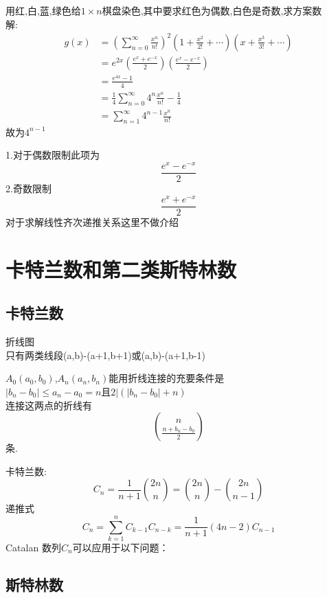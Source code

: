 \begin{example}
  用红,白,蓝,绿色给$1\times n$棋盘染色,其中要求红色为偶数,白色是奇数,求方案数\\
  解:\\
  $$
  \begin{aligned}
    g(x)&=\left(\sum_{n=0}^{\infty}\frac{x^n}{n!} \right)^2\left(1+\frac{x^2}{2!}+\cdots \right)\left(x+\frac{x^3}{3!}+\cdots \right)\\
    &=e^{2x}\left(\frac{e^x+e^{-x}}{2} \right) \left( \frac{e^x-e^{-x}}{2} \right)\\
    &=\frac{e^{4x}-1}{4}\\
    &=\frac{1}{4}\sum_{n=0}^{\infty} 4^{n} \frac{x^n}{n!}-\frac{1}{4}\\
    &=\sum_{n=1}^{\infty} 4^{n-1} \frac{x^n}{n!}
    \end{aligned}
  $$
  故为$4^{n-1}$
\end{example}
1.对于偶数限制此项为\\
\[
\frac{e^x-e^{-x}}{2}
\]
2.奇数限制\\
\[
\frac{e^x+e^{-x}}{2}
\]
对于求解线性齐次递推关系这里不做介绍


\section{卡特兰数和第二类斯特林数}
\subsection{卡特兰数}
折线图\\
只有两类线段(a,b)-(a+1,b+1)或(a,b)-(a+1,b-1)\\
\begin{proposition}
  $A_0(a_0,b_0)$,$A_n(a_n,b_n)$能用折线连接的充要条件是\\
  $|b_n-b_0|\le a_n-a_0=n$且$2|(|b_n-b_0|+n)$\\
  连接这两点的折线有
  $$
  \binom{n}{\frac{n+b_n-b_0}{2}}
  $$
  条.
\end{proposition}
卡特兰数:\\
$$
C_n=\frac{1}{n+1}\binom{2n}{n}=\binom{2n}{n}-\binom{2n}{n-1}
$$
递推式\\
$$
C_n=\sum_{k=1}^{n}C_{k-1}C_{n-k}=\frac{1}{n+1} (4n-2)C_{n-1}
$$
Catalan 数列$C_n$可以应用于以下问题：\\


\subsection{斯特林数}

